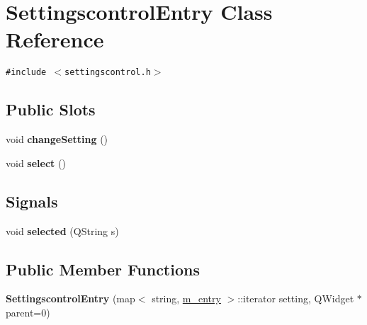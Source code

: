 \hypertarget{class_settingscontrol_entry}{
\section{SettingscontrolEntry Class Reference}
\label{class_settingscontrol_entry}
}
{\tt \#include $<$settingscontrol.h$>$}

\subsection*{Public Slots}
\begin{CompactItemize}
\item 
\hypertarget{class_settingscontrol_entry_138dbc4f1c0ca3a1fd1b4a9f892281e0}{
void \textbf{changeSetting} ()}
\label{class_settingscontrol_entry_138dbc4f1c0ca3a1fd1b4a9f892281e0}

\item 
\hypertarget{class_settingscontrol_entry_e748a78b06cbfee82ccf4fe5f3fb02d7}{
void \textbf{select} ()}
\label{class_settingscontrol_entry_e748a78b06cbfee82ccf4fe5f3fb02d7}

\end{CompactItemize}
\subsection*{Signals}
\begin{CompactItemize}
\item 
\hypertarget{class_settingscontrol_entry_a4dec2bec0c9b58278ee82bbc02619bf}{
void \textbf{selected} (QString s)}
\label{class_settingscontrol_entry_a4dec2bec0c9b58278ee82bbc02619bf}

\end{CompactItemize}
\subsection*{Public Member Functions}
\begin{CompactItemize}
\item 
\hypertarget{class_settingscontrol_entry_a2ba9139314f2d680ec9dafc933da09e}{
\textbf{SettingscontrolEntry} (map$<$ string, \hyperlink{classm__entry}{m\_\-entry} $>$::iterator setting, QWidget $\ast$parent=0)}
\label{class_settingscontrol_entry_a2ba9139314f2d680ec9dafc933da09e}

\end{CompactItemize}
